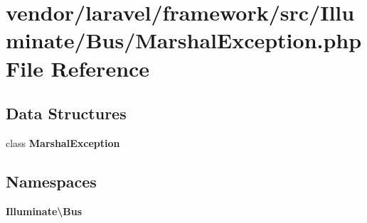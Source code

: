 \section{vendor/laravel/framework/src/\+Illuminate/\+Bus/\+Marshal\+Exception.php File Reference}
\label{_marshal_exception_8php}
\subsection*{Data Structures}
\begin{DoxyCompactItemize}
\item 
class {\bf Marshal\+Exception}
\end{DoxyCompactItemize}
\subsection*{Namespaces}
\begin{DoxyCompactItemize}
\item 
 {\bf Illuminate\textbackslash{}\+Bus}
\end{DoxyCompactItemize}
